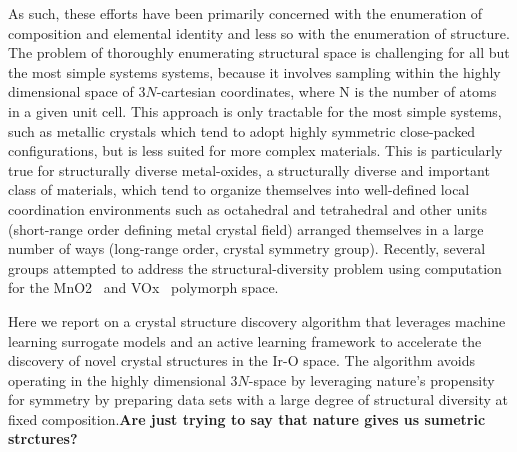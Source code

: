 As such, these efforts have been primarily concerned with the enumeration of composition and elemental identity and less so with the enumeration of structure.
%
The problem of thoroughly enumerating structural space is challenging for all but the most simple systems systems, because it involves sampling within the highly dimensional space of $3N$-cartesian coordinates, where N is the number of atoms in a given unit cell.
This approach is only tractable for the most simple systems,
such as metallic crystals which tend to adopt highly symmetric close-packed configurations, but is less suited for more complex materials.
%
This is particularly true for structurally diverse metal-oxides, a structurally diverse and important class of materials, which tend to organize themselves into well-defined local coordination environments such as octahedral and tetrahedral and other units (short-range order defining metal crystal field) arranged themselves in a large number of ways (long-range order, crystal symmetry group). Recently, several groups attempted to address the structural-diversity problem using computation for the MnO2~\cite{} and VOx~\cite{} polymorph space.

%
%
Here we report on a crystal structure discovery  algorithm that leverages machine learning surrogate models and an active learning framework to accelerate the discovery of novel crystal structures in the Ir-O space.
The algorithm avoids operating in the highly dimensional $3N$-space by leveraging nature's propensity for symmetry by preparing data sets with a large degree of structural diversity at fixed composition.{\bf Are just trying to say that nature gives us sumetric strctures?}
%
%


